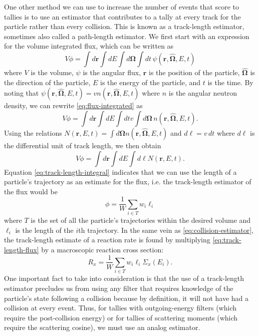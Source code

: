 One other method we can use to increase the number of events that score to
tallies is to use an estimator that contributes to a tally at every track for
the particle rather than every collision. This is known as a track-length
estimator, sometimes also called a path-length estimator. We first start with an
expression for the volume integrated flux, which can be written as
\begin{equation}
  \label{eq:flux-integrated}
  V \phi = \int d\mathbf{r} \int dE \int d\mathbf{\Omega} \int dt \,
  \psi(\mathbf{r}, \mathbf{\hat{\Omega}}, E, t)
\end{equation}
where $V$ is the volume, $\psi$ is the angular flux, $\mathbf{r}$ is the
position of the particle, $\mathbf{\hat{\Omega}}$ is the direction of the
particle, $E$ is the energy of the particle, and $t$ is the time. By noting that
$\psi(\mathbf{r}, \mathbf{\hat{\Omega}}, E, t) = v n(\mathbf{r},
\mathbf{\hat{\Omega}}, E, t)$ where $n$ is the angular neutron density, we can
rewrite \eqref{eq:flux-integrated} as
\begin{equation}
  \label{eq:flux-integrated-2}
  V \phi = \int d\mathbf{r} \int dE \int dt v \int d\mathbf{\Omega} \, n(\mathbf{r},
  \mathbf{\hat{\Omega}}, E, t).
\end{equation}
Using the relations $N(\mathbf{r}, E, t) = \int d\mathbf{\Omega} n(\mathbf{r},
\mathbf{\hat{\Omega}}, E, t)$ and $d\ell = v \, dt$ where $d\ell$ is the
differential unit of track length, we then obtain
\begin{equation}
  \label{eq:track-length-integral}
  V \phi = \int d\mathbf{r} \int dE \int d\ell N(\mathbf{r}, E, t).
\end{equation}
Equation \eqref{eq:track-length-integral} indicates that we can use the length
of a particle's trajectory as an estimate for the flux, i.e. the track-length
estimator of the flux would be
\begin{equation}
  \label{eq:track-length-flux}
  \phi = \frac{1}{W} \sum_{i \in T} w_i \ell_i
\end{equation}
where $T$ is the set of all the particle's trajectories within the desired
volume and $\ell_i$ is the length of the $i$th trajectory. In the same vein as
\eqref{eq:collision-estimator}, the track-length estimate of a reaction rate is
found by multiplying \eqref{eq:track-length-flux} by a macroscopic reaction
cross section:
\begin{equation}
  \label{eq:track-length-estimator}
  R_x = \frac{1}{W} \sum_{i \in T} w_i \ell_i \Sigma_x (E_i).
\end{equation}
One important fact to take into consideration is that the use of a track-length
estimator precludes us from using any filter that requires knowledge of the
particle's state following a collision because by definition, it will not have
had a collision at every event. Thus, for tallies with outgoing-energy filters
(which require the post-collision energy) or for tallies of scattering moments
(which require the scattering cosine), we must use an analog estimator.


